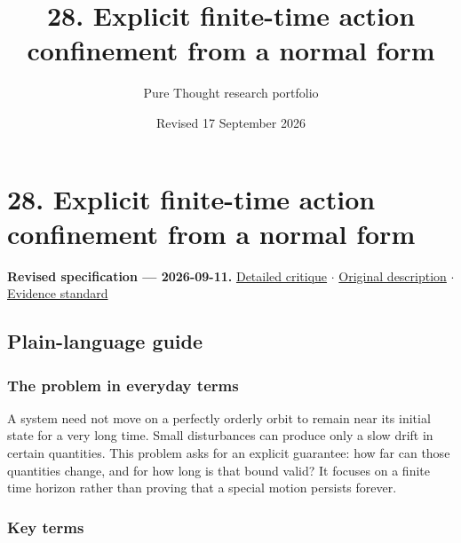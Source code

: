 \documentclass[
  11pt,
]{article}
\title{28. Explicit finite-time action confinement from a normal form}
\author{Pure Thought research portfolio}
\date{Revised 17 September 2026}
\begin{document}
\maketitle
\thispagestyle{empty}
\clearpage

\section{28. Explicit finite-time action confinement from a normal form}

\textbf{Revised specification --- 2026-09-11.}
\href{https://github.com/rick-stevens-ai/Pure-Thought/blob/main/reviews/28-Nekhoroshev-Stability-Theory.md}{Detailed
critique} \ensuremath{\cdot}
\href{https://github.com/rick-stevens-ai/Pure-Thought/blob/main/archive/original-PRDs/28-Nekhoroshev-Stability-Theory.md}{Original
description} \ensuremath{\cdot}
\href{https://github.com/rick-stevens-ai/Pure-Thought/blob/main/reviews/EVIDENCE-STANDARD.md}{Evidence
standard}

\subsection{Plain-language guide}

\subsubsection{The problem in everyday terms}

A system need not move on a perfectly orderly orbit to remain near its
initial state for a very long time. Small disturbances can produce only
a slow drift in certain quantities. This problem asks for an explicit
guarantee: how far can those quantities change, and for how long is that
bound valid? It focuses on a finite time horizon rather than proving
that a special motion persists forever.

\subsubsection{Key terms}
\end{document}
